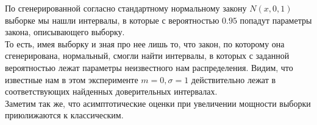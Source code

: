 \documentclass[../body.tex]{subfiles}
\begin{document}
	 По сгенерированной согласно стандартному нормальному закону $N(x, 0, 1)$ выборке мы нашли интервалы, в которые с вероятностью $0.95$ попадут параметры закона, описывающего выборку.\\ То есть, имея выборку и зная про нее лишь то, что закон, по которому она сгенерирована, нормальный, смогли найти интервалы, в которых с заданной вероятностью лежат параметры неизвестного нам распределения.
	 Видим, что известные нам в этом эксперименте $m = 0, \sigma = 1$ действительно лежат в соответствующих найденных доверительных интервалах.\\
	 Заметим так же, что асимптотические оценки при увеличении мощности выборки приюлижаются к классическим.
\end{document}
